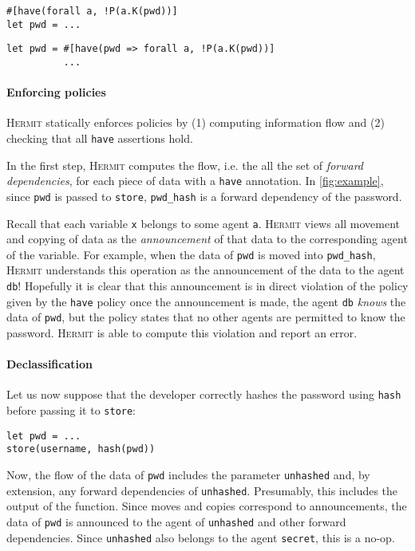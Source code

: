\documentclass[letterpaper,twocolumn,10pt]{article}
\newcommand{\Hermit}{\textsc{Hermit}}
\begin{document}
\begin{lstlisting}[firstnumber=16]
#[have(forall a, !P(a.K(pwd))]
let pwd = ...
\end{lstlisting}

\begin{lstlisting}[firstnumber=16]
let pwd = #[have(pwd => forall a, !P(a.K(pwd))]
          ...
\end{lstlisting}

\paragraph{Enforcing policies}
\Hermit{} statically enforces policies by (1) computing information flow and (2) checking that all
\lstinline{have} assertions hold.

In the first step, \Hermit{} computes the flow, i.e. the all the set of \emph{forward dependencies},
for each piece of data with a \lstinline{have} annotation. In \cref{fig:example}, since
\lstinline{pwd} is passed to \lstinline{store}, \lstinline{pwd_hash} is a forward dependency of the
password.

Recall that each variable \lstinline{x} belongs to some agent \lstinline{a}.
\Hermit{} views all movement and copying of data as the \emph{announcement} of that data to the
corresponding agent of the variable. For example, when the data of \lstinline{pwd} is moved into
\lstinline{pwd_hash}, \Hermit{} understands this operation as the announcement of the data to the
agent \lstinline{db}! Hopefully it is clear that this announcement is in direct violation of the
policy given by the \lstinline{have} policy once the announcement is made, the agent
\lstinline{db} \emph{knows} the data of \lstinline{pwd}, but the policy states that no other agents
are permitted to know the password. \Hermit{} is able to compute this violation and report an error.

\paragraph{Declassification}
Let us now suppose that the developer correctly hashes the password using \lstinline{hash} before
passing it to \lstinline{store}:

\begin{lstlisting}[firstnumber=16]
let pwd = ...
store(username, hash(pwd))
\end{lstlisting}

Now, the flow of the data of \lstinline{pwd} includes the parameter \lstinline{unhashed} and, by
extension, any forward dependencies of \lstinline{unhashed}. Presumably, this includes the output of
the function. Since moves and copies correspond to announcements, the data of \lstinline{pwd} is
announced to the agent of \lstinline{unhashed} and other forward dependencies. Since
\lstinline{unhashed} also belongs to the agent \lstinline{secret}, this is a no-op.
\end{document}
